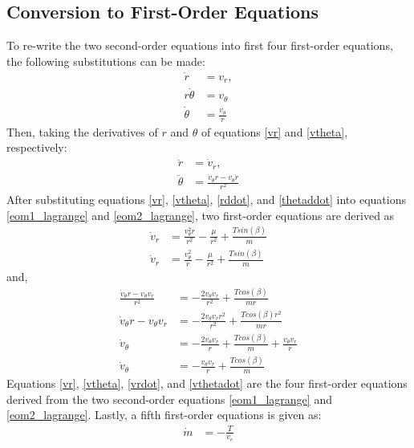 \documentclass[]{article}
\begin{document}
\subsection{Conversion to First-Order Equations}
To re-write the two second-order equations into first four first-order equations, the following substitutions can be made:
\begin{align}
	\dot{r}       &= v_r,     \label{vr} \\
	r\dot{\theta} &= v_\theta  \nonumber \\
	\dot{\theta}  &= \frac{v_\theta}{r} \label{vtheta}
\end{align}
Then, taking the derivatives of \(r\) and \(\theta\) of equations \ref{vr} and \ref{vtheta}, respectively:
\begin{align}
	\ddot{r}      &= \dot{v}_r,  \label{rddot} \\
	\ddot{\theta} &= \frac{\dot{v}_{\theta}r - v_{\theta}\dot{r}}{r^2} \label{thetaddot}
\end{align}
After substituting equations \ref{vr}, \ref{vtheta}, \ref{rddot}, and \ref{thetaddot} into equations \ref{eom1_lagrange} and \ref{eom2_lagrange}, two first-order equations are derived as
\begin{align}
    \dot{v}_r     &= \frac{v^2_{\theta}r}{r^2} - \frac{\mu}{r^2} + \frac{Tsin(\beta)}{m}                      \nonumber \\
    \dot{v}_r     &= \frac{v^2_{\theta}}{r} - \frac{\mu}{r^2} + \frac{Tsin(\beta)}{m}                         \label{vrdot}
\end{align}
and,
\begin{align}
	\frac{\dot{v}_{\theta}r - v_{\theta}v_r}{r^2} &= -\frac{2v_{\theta}v_r}{r^2}   + \frac{Tcos(\beta)}{mr}   \nonumber\\
	\dot{v}_{\theta}r - v_{\theta}v_r &= -\frac{2v_{\theta}v_{r}r^2}{r^2}   + \frac{Tcos(\beta)r^2}{mr}       \nonumber\\
	\dot{v}_\theta &= -\frac{2v_{\theta}v_{r}}{r}   + \frac{Tcos(\beta)}{m} + \frac{v_{\theta}v_r}{r}         \nonumber\\
	\dot{v}_\theta &= -\frac{v_{\theta}v_{r}}{r}   + \frac{Tcos(\beta)}{m} \label{vthetadot}
\end{align}
Equations \ref{vr}, \ref{vtheta}, \ref{vrdot}, and \ref{vthetadot} are the four first-order equations derived from the two second-order equations \ref{eom1_lagrange} and \ref{eom2_lagrange}. Lastly, a fifth first-order equations is given as:
\begin{align}
	\dot{m} &= -\frac{T}{v_e} \label{massflowrate}
\end{align}
\end{document}
